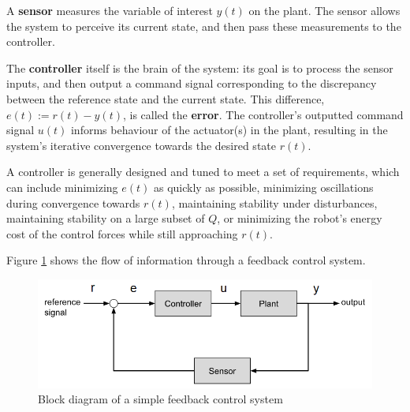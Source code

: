 \documentclass[main.tex]{subfiles}
\begin{document}
A \textbf{sensor} measures the variable of interest $y(t)$ on the plant. The sensor allows the system to perceive its current state, and then pass these measurements to the controller\cite{franklin2002feedback}. 

The \textbf{controller} itself is the brain of the system: its goal is to process the sensor inputs, and then output a command signal corresponding to the discrepancy between the reference state and the current state. This difference, $e(t):=r(t)-y(t)$, is called the \textbf{error}. The controller's outputted command signal $u(t)$ informs behaviour of the actuator(s) in the plant, resulting in the system's iterative convergence towards the desired state $r(t).$

A controller is generally designed and tuned to meet a set of requirements\cite{franklin2002feedback}, which can include minimizing $e(t)$ as quickly as possible, minimizing oscillations during convergence towards $r(t)$, maintaining stability under disturbances, maintaining stability on a large subset of $Q$, or minimizing the robot's energy cost of the control forces while still approaching $r(t)$.

Figure \ref{fig:feedback} shows the flow of information through a feedback control system.
\begin{figure}[h]
    \centering
    \includegraphics[width=0.75\columnwidth]{assets/feedback-modified.png}
    \caption{Block diagram of a simple feedback control system}
    \label{fig:feedback}
\end{figure}
\end{document}
